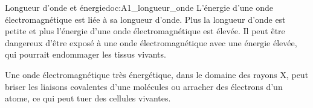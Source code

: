 \begin{doc}{Longueur d'onde et énergie}{doc:A1_longueur_onde}
  L'énergie d'une onde électromagnétique est liée à sa longueur d'onde.
  Plus la longueur d'onde est petite et plus l'énergie d'une onde électromagnétique est élevée. 
  Il peut être dangereux d'être exposé à une onde électromagnétique avec une énergie élevée, qui pourrait endommager les tissus vivants.
  
  Une onde électromagnétique très énergétique, dans le domaine des rayons X, peut briser les liaisons covalentes d'une molécules ou arracher des électrons d'un atome, ce qui peut tuer des cellules vivantes.
\end{doc}

